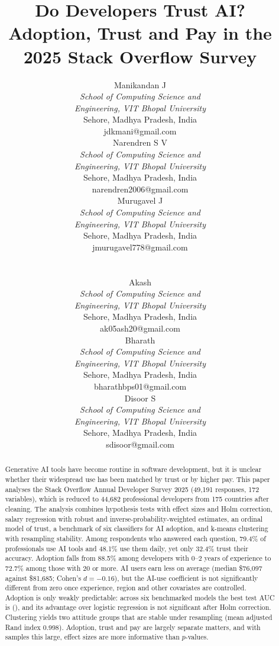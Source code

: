 \documentclass[conference]{IEEEtran}
\newcommand{\authblock}[2]{\begin{minipage}[t]{0.31\textwidth}\centering
{\large #1}\\[0.5ex]
\footnotesize\textit{School of Computing Science and}\\
\footnotesize\textit{Engineering, VIT Bhopal University}\\
\footnotesize Sehore, Madhya Pradesh, India\\
\footnotesize #2
\end{minipage}}
\begin{document}
\title{Do Developers Trust AI? Adoption, Trust and Pay in the 2025 Stack Overflow Survey}

\author{%
\begin{minipage}{\textwidth}\centering
\authblock{Manikandan J}{jdkmani@gmail.com}\hfill
\authblock{Narendren S V}{narendren2006@gmail.com}\hfill
\authblock{Murugavel J}{jmurugavel778@gmail.com}\\[1.2ex]
\authblock{Akash}{ak05ash20@gmail.com}\hfill
\authblock{Bharath}{bharathbps01@gmail.com}\hfill
\authblock{Disoor S}{sdisoor@gmail.com}
\end{minipage}}

\maketitle

\begin{abstract}
Generative AI tools have become routine in software development, but it is unclear whether their widespread use has been matched by trust or by higher pay. This paper analyses the Stack Overflow Annual Developer Survey 2025 (49{,}191 responses, 172 variables), which is reduced to 44{,}682 professional developers from 175 countries after cleaning. The analysis combines hypothesis tests with effect sizes and Holm correction, salary regression with robust and inverse-probability-weighted estimates, an ordinal model of trust, a benchmark of six classifiers for AI adoption, and k-means clustering with resampling stability. Among respondents who answered each question, 79.4\% of professionals use AI tools and 48.1\% use them daily, yet only 32.4\% trust their accuracy. Adoption falls from 88.5\% among developers with 0--2 years of experience to 72.7\% among those with 20 or more. AI users earn less on average (median \$76{,}097 against \$81{,}685; Cohen's $d=-0.16$), but the AI-use coefficient is not significantly different from zero once experience, region and other covariates are controlled. Adoption is only weakly predictable: across six benchmarked models the best test AUC is \bestAUC{} (\bestModel), and its advantage over logistic regression is not significant after Holm correction. Clustering yields two attitude groups that are stable under resampling (mean adjusted Rand index 0.998). Adoption, trust and pay are largely separate matters, and with samples this large, effect sizes are more informative than $p$-values.
\end{abstract}
\end{document}
